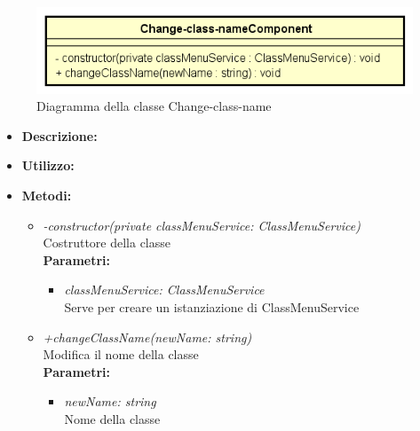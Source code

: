 \begin{figure}[h!]
	\centering
	\includegraphics[scale=0.8]{res/sections/SpecificaFrontEnd/Components/Disegnetti/change-class-name.png}
	\caption{Diagramma della classe Change-class-name}
\end{figure}

\begin{itemize}
	\item \textbf{Descrizione:}\\
	
	\item \textbf{Utilizzo:}\\
	
	\item \textbf{Metodi:}
		\begin{itemize}
			\item \emph{-constructor(private classMenuService: ClassMenuService)}\\
    		Costruttore della classe\\
    		\textbf{Parametri:}
    		\begin{itemize}
    			\item \emph{classMenuService: ClassMenuService}\\
    			Serve per creare un istanziazione di ClassMenuService
    		\end{itemize}
    		\item \emph{+changeClassName(newName: string)}\\
    		Modifica il nome della classe\\
    		\textbf{Parametri:}
    		\begin{itemize}
    			\item \emph{newName: string}\\
    			Nome della classe
    		\end{itemize}
		\end{itemize}
\end{itemize}